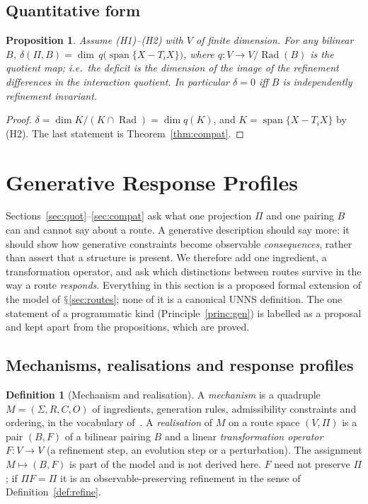 \documentclass[11pt,a4paper]{article}
\renewcommand{\S}{\ensuremath{\mathsection}}
\newcommand{\Rad}{\operatorname{Rad}}
\newcommand{\spn}{\operatorname{span}}
\newcommand{\defic}{\delta}
\theoremstyle{plain}
\newtheorem{proposition}[theorem]{Proposition}
\theoremstyle{definition}
\newtheorem{definition}[theorem]{Definition}
\begin{document}
\subsection{Quantitative form}
\begin{proposition}\label{prop:quant}
Assume (H1)--(H2) with $V$ of finite dimension. For any bilinear $B$, $\defic(\Pi,B)=\dim\,q\bigl(\spn\{X-T_iX\}\bigr)$, where $q\colon V\to V/\Rad(B)$ is the quotient map; i.e.\ the deficit is the dimension of the image of the refinement differences in the interaction quotient. In particular $\defic=0$ iff $B$ is independently refinement invariant.
\end{proposition}
\begin{proof}
$\defic=\dim K/(K\cap\Rad)=\dim q(K)$, and $K=\spn\{X-T_iX\}$ by (H2). The last statement is Theorem~\ref{thm:compat}.
\end{proof}


\section{Generative Response Profiles}\label{sec:response}
Sections~\ref{sec:quot}--\ref{sec:compat} ask what one projection $\Pi$ and one pairing $B$ can and cannot say about a route.
A generative description should say more: it should show how generative constraints become observable \emph{consequences}, rather than assert that a structure is present.
We therefore add one ingredient, a transformation operator, and ask which distinctions between routes survive in the way a route \emph{responds}.
Everything in this section is a proposed formal extension of the model of \S\ref{sec:routes}; none of it is a canonical UNNS definition.
The one statement of a programmatic kind (Principle~\ref{princ:gen}) is labelled as a proposal and kept apart from the propositions, which are proved.

\subsection{Mechanisms, realisations and response profiles}
\begin{definition}[Mechanism and realisation]\label{def:mech}
A \emph{mechanism} is a quadruple $M=(\Sigma,R,C,O)$ of ingredients, generation rules, admissibility constraints and ordering, in the vocabulary of~\cite{G3}.
A \emph{realisation} of $M$ on a route space $(V,\Pi)$ is a pair $(B,F)$ of a bilinear pairing $B$ and a linear \emph{transformation operator} $F\colon V\to V$ (a refinement step, an evolution step or a perturbation).
The assignment $M\mapsto(B,F)$ is part of the model and is not derived here.
$F$ need not preserve $\Pi$; if $\Pi F=\Pi$ it is an observable-preserving refinement in the sense of Definition~\ref{def:refine}.
\end{definition}
\end{document}
